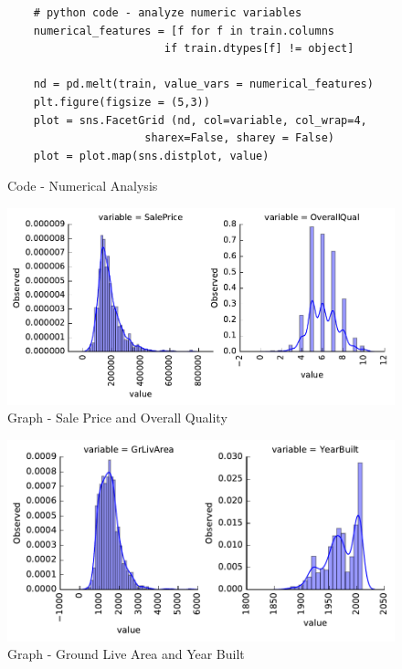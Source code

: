 \documentclass[sigconf]{acmart}
\begin{document}
	\begin{figure}[htb]
	\begin{verbatim}
	# python code - analyze numeric variables
	numerical_features = [f for f in train.columns 
						if train.dtypes[f] != object]
	
	nd = pd.melt(train, value_vars = numerical_features)	
	plt.figure(figsize = (5,3))
	plot = sns.FacetGrid (nd, col=variable, col_wrap=4,
	                 sharex=False, sharey = False)
	plot = plot.map(sns.distplot, value)				
	\end{verbatim}
	\caption{Code - Numerical Analysis}\label{c:analyze-numeric}
	\end{figure}

	
	\begin{figure}[htb]
		\centering
		\includegraphics[width=1.0\columnwidth]{images/num_features_1}	
		\caption{Graph - Sale Price and Overall Quality}\label{fig:num-feature-1}		
	\end{figure}

	\begin{figure}[htb]
		\centering
		\includegraphics[width=1.0\columnwidth]{images/num_features_2}	
		\caption{Graph - Ground Live Area and Year Built} \label{fig:num_features_2} 
	\end{figure}
\end{document}
